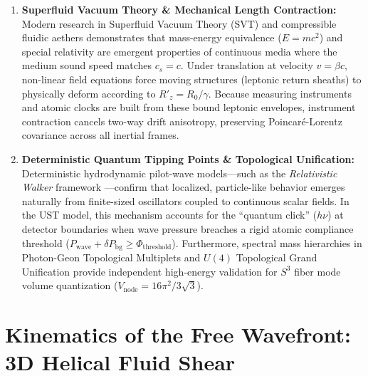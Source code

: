 \documentclass[11pt,a4paper]{article}
\begin{document}
\begin{enumerate}
		\item \textbf{Superfluid Vacuum Theory \& Mechanical Length Contraction:}
		Modern research in Superfluid Vacuum Theory (SVT) \cite{volovik2003} and compressible fluidic aethers \cite{verozub2020} demonstrates that mass-energy equivalence ($E=mc^2$) and special relativity are emergent properties of continuous media where the medium sound speed matches $c_s = c$. Under translation at velocity $v = \beta c$, non-linear field equations force moving structures (leptonic return sheaths) to physically deform according to $R'_z = R_0 / \gamma$. Because measuring instruments and atomic clocks are built from these bound leptonic envelopes, instrument contraction cancels two-way drift anisotropy, preserving Poincaré-Lorentz covariance across all inertial frames.
		
		\item \textbf{Deterministic Quantum Tipping Points \& Topological Unification:}
		Deterministic hydrodynamic pilot-wave models—such as the \textit{Relativistic Walker} framework \cite{kulangiev2025}—confirm that localized, particle-like behavior emerges naturally from finite-sized oscillators coupled to continuous scalar fields. In the UST model, this mechanism accounts for the ``quantum click'' ($h\nu$) at detector boundaries when wave pressure breaches a rigid atomic compliance threshold ($P_{\text{wave}} + \delta P_{\text{bg}} \ge \Phi_{\text{threshold}}$). Furthermore, spectral mass hierarchies in Photon-Geon Topological Multiplets \cite{miley2025} and $U(4)$ Topological Grand Unification \cite{mastoridis2026} provide independent high-energy validation for $S^3$ fiber mode volume quantization ($V_{\text{node}} = 16\pi^2 / 3\sqrt{3}$).
	\end{enumerate}
	
	\section{Kinematics of the Free Wavefront: 3D Helical Fluid Shear}
	
\end{document}
